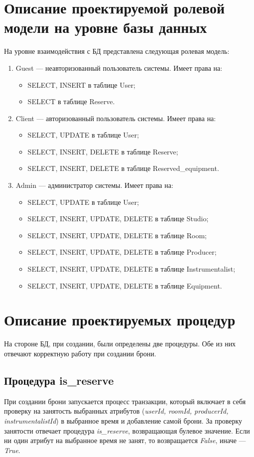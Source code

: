 \section{Описание проектируемой ролевой модели на уровне базы данных}
На уровне взаимодействия с БД представлена следующая ролевая модель:
\begin{enumerate}
	\item Guest --- неавторизованный пользователь системы. Имеет права на:
	\begin{itemize}
		\item SELECT, INSERT в таблице User;
		\item SELECT в таблице Reserve.
	\end{itemize}
	\item Client --- авторизованный пользователь системы. Имеет права на:
	\begin{itemize}
		\item SELECT, UPDATE в таблице User;
		\item SELECT, INSERT, DELETE в таблице Reserve;
		\item SELECT, INSERT, DELETE в таблице Reserved\_equipment.
	\end{itemize}
	\item Admin --- администратор системы. Имеет права на:
	\begin{itemize}
	\item SELECT, UPDATE в таблице User;
	\item SELECT, INSERT, UPDATE, DELETE в таблице Studio;
	\item SELECT, INSERT, UPDATE, DELETE в таблице Room;
	\item SELECT, INSERT, UPDATE, DELETE в таблице Producer;
	\item SELECT, INSERT, UPDATE, DELETE в таблице Instrumentalist;
	\item SELECT, INSERT, UPDATE, DELETE в таблице Equipment.
	\end{itemize}
\end{enumerate} 

\section{Описание проектируемых процедур}

На стороне БД, при создании, были определены две процедуры. Обе из них отвечают корректную работу при создании брони.

\subsection{Процедура is\_reserve}
При создании брони запускается процесс транзакции, который включает в себя проверку на занятость выбранных атрибутов (\textit{userId, roomId, producerId, instrumentalistId}) в выбранное время и добавление самой брони.
За проверку занятости отвечает процедура \textit{is\_reserve}, возвращающая булевое значение.
Если ни один атрибут на выбранное время не занят, то возвращается \textit{False}, иначе --- \textit{True}.

